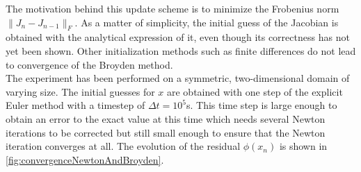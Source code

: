 The motivation behind this update scheme is to minimize the Frobenius norm $\|J_n - J_{n-1}\|_F$. As a matter of simplicity, the initial guess of the Jacobian is obtained with the analytical expression of it, even though its correctness has not yet been shown. Other initialization methods such as finite differences do not lead to convergence of the Broyden method. \\
The experiment has been performed on a symmetric, two-dimensional domain of varying size. The initial guesses for $x$ are obtained with one step of the explicit Euler method with a timestep of $\Delta t = 10^5$s. This time step is large enough to obtain an error to the exact value at this time which needs several Newton iterations to be corrected but still small enough to ensure that the Newton iteration converges at all. The evolution of the residual $\phi(x_n)$ is shown in \autoref{fig:convergenceNewtonAndBroyden}.
